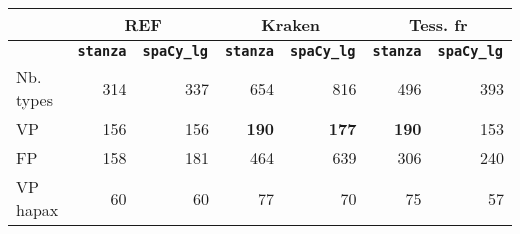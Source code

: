 
\footnotesize\begin{tabular}{|l|r|r|r|r|r|r|}
 \hline
 &\multicolumn{2}{c|}{REF}&\multicolumn{2}{c|}{Kraken} &\multicolumn{2}{c|}{Tess. fr}\\
\hline

 & \bf {\texttt{stanza}}  &\bf {\texttt{spaCy\_lg }}&\bf {\texttt{stanza}}  &\bf {\texttt{spaCy\_lg }}&\bf {\texttt{stanza}}  &\bf {\texttt{spaCy\_lg }}\\

\hline
Nb. types& 314& 337&654& 816&496&393\\
VP&156 &156 &\textbf{190}&\textbf{177}&\textbf{190}& 153\\
FP &158 &181 &464&639&306&240\\

\hline
\hline
VP hapax&60&60&77&70&75&57\\
\hline

\end{tabular}